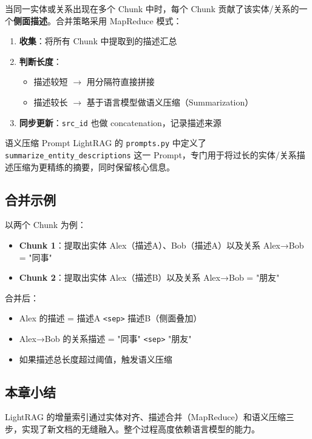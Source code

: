 \documentclass[a4paper]{article}
\begin{document}
当同一实体或关系出现在多个 Chunk 中时，每个 Chunk 贡献了该实体/关系的一个\textbf{侧面描述}。合并策略采用 MapReduce 模式：

\begin{enumerate}
    \item \textbf{收集}：将所有 Chunk 中提取到的描述汇总
    \item \textbf{判断长度}：
    \begin{itemize}
        \item 描述较短 $\rightarrow$ 用分隔符直接拼接
        \item 描述较长 $\rightarrow$ 基于语言模型做语义压缩（Summarization）
    \end{itemize}
    \item \textbf{同步更新}：\texttt{src\_id} 也做 concatenation，记录描述来源
\end{enumerate}

\begin{importantbox}{语义压缩 Prompt}
LightRAG 的 \texttt{prompts.py} 中定义了 \texttt{summarize\_entity\_descriptions} 这一 Prompt，专门用于将过长的实体/关系描述压缩为更精练的摘要，同时保留核心信息。
\end{importantbox}

\subsection{合并示例}

以两个 Chunk 为例：
\begin{itemize}
    \item \textbf{Chunk 1}：提取出实体 Alex（描述A）、Bob（描述A）以及关系 Alex→Bob = "同事"
    \item \textbf{Chunk 2}：提取出实体 Alex（描述B）以及关系 Alex→Bob = "朋友"
\end{itemize}

合并后：
\begin{itemize}
    \item Alex 的描述 = 描述A \texttt{<sep>} 描述B（侧面叠加）
    \item Alex→Bob 的关系描述 = "同事" \texttt{<sep>} "朋友"
    \item 如果描述总长度超过阈值，触发语义压缩
\end{itemize}

\subsection{本章小结}

LightRAG 的增量索引通过实体对齐、描述合并（MapReduce）和语义压缩三步，实现了新文档的无缝融入。整个过程高度依赖语言模型的能力。
\end{document}
